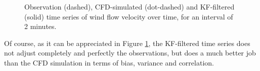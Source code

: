 \documentclass{article}
\theoremstyle{definition}
\theoremstyle{definition}
\theoremstyle{remark}
\theoremstyle{mythmstyle}
\begin{document}
\begin{figure}[!ht]
  \centering
  \caption{Observation (dashed), CFD-simulated (dot-dashed) and KF-filtered (solid) time series of wind flow velocity over time, for an interval of 2 minutes.}
  \label{fig:implem}
\end{figure}

Of course, as it can be appreciated in Figure \ref{fig:implem}, the KF-filtered time series does not adjust completely and perfectly the observations, but does a much better job than the CFD simulation in terms of bias, variance and correlation.


\end{document}
